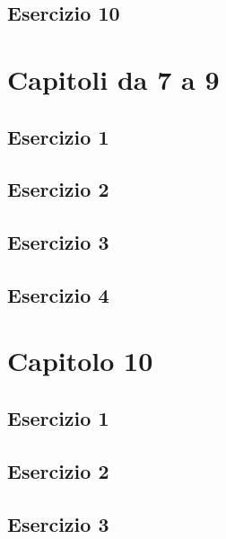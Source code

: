 \documentclass[a4paper,12pt,oneside]{book}
\begin{document}
\hypertarget{esercizio-10}{%
\subsection{Esercizio 10}\label{esercizio-10}}

\hypertarget{capitoli-da-7-a-9}{%
\section{Capitoli da 7 a 9}\label{capitoli-da-7-a-9}}

\hypertarget{esercizio-1-5}{%
\subsection{Esercizio 1}\label{esercizio-1-5}}

\hypertarget{esercizio-2-5}{%
\subsection{Esercizio 2}\label{esercizio-2-5}}

\hypertarget{esercizio-3-4}{%
\subsection{Esercizio 3}\label{esercizio-3-4}}

\hypertarget{esercizio-4-3}{%
\subsection{Esercizio 4}\label{esercizio-4-3}}

\hypertarget{capitolo-10}{%
\section{Capitolo 10}\label{capitolo-10}}

\hypertarget{esercizio-1-6}{%
\subsection{Esercizio 1}\label{esercizio-1-6}}

\hypertarget{esercizio-2-6}{%
\subsection{Esercizio 2}\label{esercizio-2-6}}

\hypertarget{esercizio-3-5}{%
\subsection{Esercizio 3}\label{esercizio-3-5}}
\end{document}
